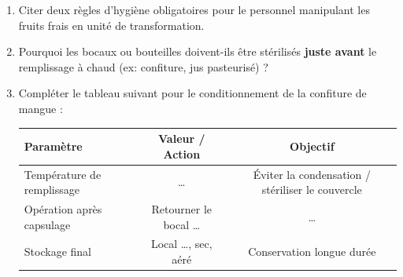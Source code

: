 \documentclass[11pt]{article}
\begin{document}
\begin{exercice}
\begin{enumerate}
    \item Citer deux règles d'hygiène obligatoires pour le personnel manipulant les fruits frais en unité de transformation.
    \item Pourquoi les bocaux ou bouteilles doivent-ils être stérilisés \textbf{juste avant} le remplissage à chaud (ex: confiture, jus pasteurisé) ?
    \item Compléter le tableau suivant pour le conditionnement de la confiture de mangue :
    \begin{tabular}{|l|c|c|}
    \hline
    \textbf{Paramètre} & \textbf{Valeur / Action} & \textbf{Objectif} \\
    \hline
    Température de remplissage & \dots & Éviter la condensation / stériliser le couvercle \\
    \hline
    Opération après capsulage & Retourner le bocal \dots & \dots \\
    \hline
    Stockage final & Local \dots, sec, aéré & Conservation longue durée \\
    \hline
    \end{tabular}
\end{enumerate}
\end{exercice}
\end{document}
